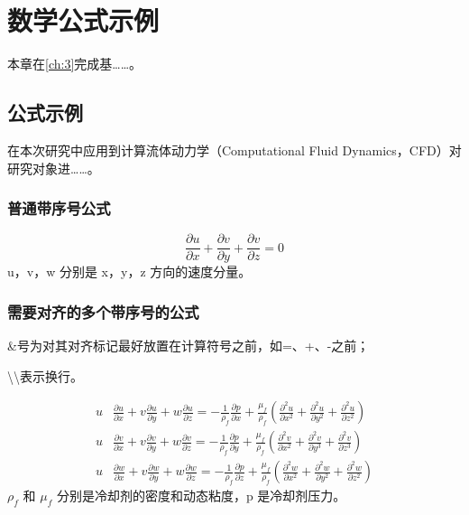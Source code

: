 
\chapter{数学公式示例}\label{ch:4}

本章在\cref{ch:3}完成基……。

\section{公式示例}
在本次研究中应用到计算流体动力学（Computational Fluid Dynamics，CFD）对研究对象进……。


\subsection{普通带序号公式}
\begin{equation}
    \frac{\partial u}{\partial x}+\frac{\partial v}{\partial y}+\frac{\partial v}{\partial z}=0
\end{equation}
u，v，w 分别是 x，y，z 方向的速度分量。


\subsection{需要对齐的多个带序号的公式}

\&号为对其对齐标记最好放置在计算符号之前，如=、+、-之前；

\textbackslash\textbackslash 表示换行。

\begin{align}%
    u & \frac{\partial u}{\partial x}+v \frac{\partial u}{\partial y}+w \frac{\partial u}{\partial z}=-\frac{1}{\rho_{f}} \frac{\partial p}{\partial x}+\frac{\mu_{f}}{\rho_{f}}\left(\frac{\partial^{2} u}{\partial x^{2}}+\frac{\partial^{2} u}{\partial y^{2}}+\frac{\partial^{2} u}{\partial z^{2}}\right) \\
    u & \frac{\partial v}{\partial x}+v \frac{\partial v}{\partial y}+w \frac{\partial v}{\partial z}=-\frac{1}{\rho_{f}} \frac{\partial p}{\partial y}+\frac{\mu_{f}}{\rho_{f}}\left(\frac{\partial^{2} v}{\partial x^{2}}+\frac{\partial^{2} v}{\partial y^{3}}+\frac{\partial^{2} v}{\partial z^{3}}\right) \\
    u & \frac{\partial w}{\partial x}+v \frac{\partial w}{\partial y}+w \frac{\partial w}{\partial z}=-\frac{1}{\rho_{f}} \frac{\partial p}{\partial z}+\frac{\mu_{f}}{\rho_{f}}\left(\frac{\partial^{2} w}{\partial x^{2}}+\frac{\partial^{2} w}{\partial y^{2}}+\frac{\partial^{2} w}{\partial z^{2}}\right)
\end{align}
$\rho_{f}$ 和 $\mu_{f}$ 分别是冷却剂的密度和动态粘度，p 是冷却剂压力。


